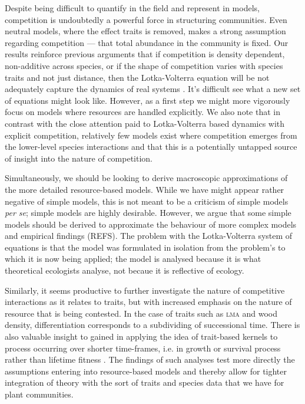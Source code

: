 \documentclass[a4paper,11pt]{article}
\begin{document}
Despite being difficult to quantify in the field and represent in
models, competition is undoubtedly a powerful force in structuring
communities.
Even neutral models, where the effect traits is removed, makes a
strong assumption regarding competition --- that total abundance in
the community is fixed.
%
Our results reinforce previous arguments that if competition is
density dependent, non-additive across species, or if the shape of
competition varies with species traits and not just distance, then the
Lotka-Volterra equation will be not adequately capture the dynamics of
real systems \cite{Andrewartha-1953, Neill-1974, Abrams-1975,
  Wangersky-1978,Abrams-1980, Tilman-1987}.  It's difficult see what a
new set of equations might look like.  However, as a first step we
might more vigorously focus on models where resources are handled
explicitly.  We also note that in contrast with the close attention
paid to Lotka-Volterra based dynamics with explicit competition,
relatively few models exist where competition emerges from the
lower-level species interactions and that this is a potentially
untapped source of insight into the nature of competition.

Simultaneously, we should be looking to derive macroscopic
approximations of the more detailed resource-based models.  While we
have might appear rather negative of simple models, this is not meant
to be a criticism of simple models \textit{per se}; simple models are
highly desirable.  However, we argue that some simple models should be
derived to approximate the behaviour of more complex models and
empirical findings
(REFS).
The problem with the Lotka-Volterra system of equations is that the
model was formulated in isolation from the problem's to which it is
now being applied; the model is analysed because it is what
theoretical ecologists analyse, not becaue it is reflective of
ecology.

Similarly, it seems productive to further investigate the nature of
competitive interactions as it relates to traits, but with increased
emphasis on the nature of resource that is being contested. In the
case of traits such as \textsc{lma} and wood density, differentiation
corresponds to a subdividing of successional time. There is also
valuable insight to gained in applying the idea of trait-based kernels
to process occurring over shorter time-frames, i.e. in growth or
survival process rather than lifetime fitness
\citep[e.g.][]{Kunstler-2012, Lasky-2015}.  The findings of such
analyses test more directly the assumptions entering into
resource-based models and thereby allow for tighter integration of
theory with the sort of traits and species data that we have for plant
communities.
\end{document}
